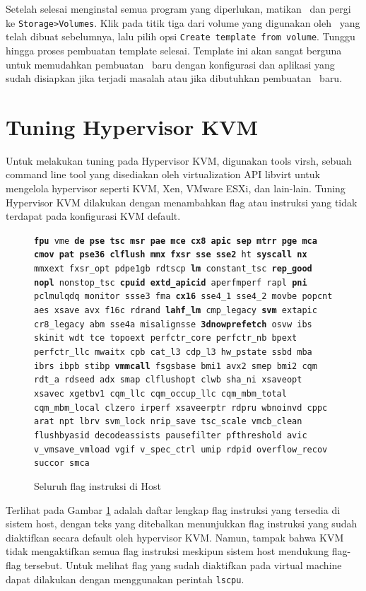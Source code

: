 Setelah selesai menginstal semua program yang diperlukan, matikan \vm\ dan pergi ke \texttt{Storage>Volumes}. Klik pada titik tiga dari volume yang digunakan oleh \vm\ yang telah dibuat sebelumnya, lalu pilih opsi \texttt{Create template from volume}. Tunggu hingga proses pembuatan template selesai. Template ini akan sangat berguna untuk memudahkan pembuatan \vm\ baru dengan konfigurasi dan aplikasi yang sudah disiapkan jika terjadi masalah atau jika dibutuhkan pembuatan \vm\ baru.

\section{Tuning Hypervisor KVM}
Untuk melakukan tuning pada Hypervisor KVM, digunakan tools virsh, sebuah command line tool yang disediakan oleh virtualization API libvirt untuk mengelola hypervisor seperti KVM, Xen, VMware ESXi, dan lain-lain. Tuning Hypervisor KVM dilakukan dengan menambahkan flag atau instruksi yang tidak terdapat pada konfigurasi KVM default.

\begin{figure}
    \texttt{\textbf{fpu} vme \textbf{de pse tsc msr pae mce cx8 apic sep mtrr pge mca cmov pat pse36 clflush mmx fxsr sse sse2} ht \textbf{syscall nx} mmxext fxsr\_opt pdpe1gb rdtscp \textbf{lm} constant\_tsc \textbf{rep\_good} \textbf{nopl} nonstop\_tsc \textbf{cpuid extd\_apicid} aperfmperf rapl \textbf{pni} pclmulqdq monitor ssse3 fma \textbf{cx16} sse4\_1 sse4\_2 movbe popcnt aes xsave avx f16c rdrand \textbf{lahf\_lm} cmp\_legacy \textbf{svm} extapic cr8\_legacy abm sse4a misalignsse \textbf{3dnowprefetch} osvw ibs skinit wdt tce topoext perfctr\_core perfctr\_nb bpext perfctr\_llc mwaitx cpb cat\_l3 cdp\_l3 hw\_pstate ssbd mba ibrs ibpb stibp \textbf{vmmcall} fsgsbase bmi1 avx2 smep bmi2 cqm rdt\_a rdseed adx smap clflushopt clwb sha\_ni xsaveopt xsavec xgetbv1 cqm\_llc cqm\_occup\_llc cqm\_mbm\_total cqm\_mbm\_local clzero irperf xsaveerptr rdpru wbnoinvd cppc arat npt lbrv svm\_lock nrip\_save tsc\_scale vmcb\_clean flushbyasid decodeassists pausefilter pfthreshold avic v\_vmsave\_vmload vgif v\_spec\_ctrl umip rdpid overflow\_recov succor smca}
    \caption{Seluruh flag instruksi di Host}
    \label{fig:flag_kvm_host}
\end{figure}

Terlihat pada Gambar \ref{fig:flag_kvm_host} adalah daftar lengkap flag instruksi yang tersedia di sistem host, dengan teks yang ditebalkan menunjukkan flag instruksi yang sudah diaktifkan secara default oleh hypervisor KVM. Namun, tampak bahwa KVM tidak mengaktifkan semua flag instruksi meskipun sistem host mendukung flag-flag tersebut. Untuk melihat flag yang sudah diaktifkan pada virtual machine dapat dilakukan dengan menggunakan perintah \texttt{lscpu}.


